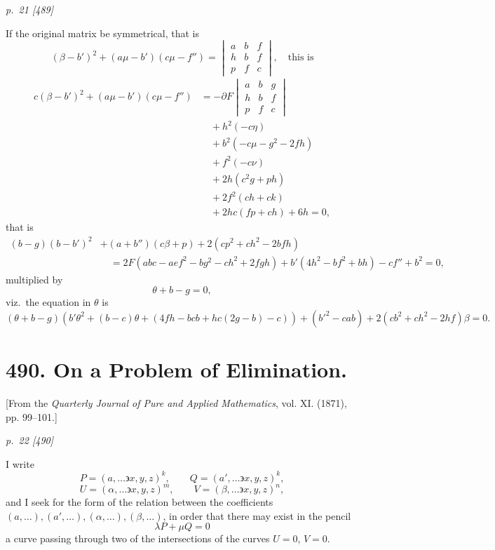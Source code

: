 ﻿\documentclass[11pt,a4paper]{article}
\theoremstyle{plain}
\theoremstyle{definition}
\newcommand{\eps}{\backepsilon}
\begin{document}
\clearpage

\bigskip
\textit{p.~21 [489]}
\smallskip

If the original matrix be symmetrical, that is
\[
(\beta - b')^2 + (a\mu - b')(c\mu - f'') = \begin{vmatrix} a & b & f \\ h & b & f \\ p & f & c \end{vmatrix}, \quad \text{this is}
\]
\begin{align*}
c(\beta - b')^2 + (a\mu - b')(c\mu - f'') &= -\partial F\begin{vmatrix} a & b & g \\ h & b & f \\ p & f & c \end{vmatrix}\\
&\quad + h^2(-c\eta)\\
&\quad + b^2(-c\mu - g^2 - 2f h)\\
&\quad + f^2(-c\nu)\\
&\quad + 2h(c^2g + ph)\\
&\quad + 2f^2(ch + ck)\\
&\quad + 2h c(fp + ch) + 6h = 0,
\end{align*}
that is
\begin{align*}
(b - g)(b - b')^2 &+ (a + b'')(c\beta + p) + 2(cp^2 + ch^2 - 2bfh)\\
&\quad = 2F(abc - aef^2 - bg^2 - ch^2 + 2fgh) + b'(4h^2 - bf^2 + bh) - cf'' + b^2 = 0,
\end{align*}
multiplied by
\[
\theta + b - g = 0,
\]
viz.\ the equation in $\theta$ is
\[
(\theta + b - g)(b'\theta^2 + (b - c)\theta + (4f h - bcb + h c(2g - b) - c)) + (b'^2 - cab) + 2(cb^2 + ch^2 - 2hf)\beta = 0.
\]

\clearpage

\section*{490. On a Problem of Elimination.}
\begin{center}
\small [From the \textit{Quarterly Journal of Pure and Applied Mathematics},
vol. XI. (1871), pp. 99--101.]
\end{center}

\textit{p.~22 [490]}

I write
\[
P=(a,\ldots \eps x,y,z)^k,\qquad
Q=(a',\ldots \eps x,y,z)^k,
\]
\[
U=(\alpha,\ldots \eps x,y,z)^m,\qquad
V=(\beta,\ldots \eps x,y,z)^n,
\]
and I seek for the form of the relation between the coefficients
\((a,\ldots),(a',\ldots),(\alpha,\ldots),(\beta,\ldots)\), in order that
there may exist in the pencil
\[
\lambda P+\mu Q=0
\]
a curve passing through two of the intersections of the curves \(U=0\),
\(V=0\).
\end{document}
